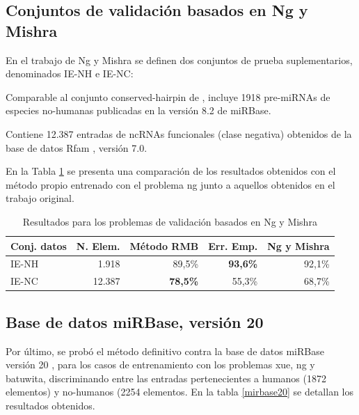\documentclass[12pt,bibliography=oldstyle,DIV=12,parskip=half-]{scrreprt}
\begin{document}
\subsection{Conjuntos de validación basados en Ng y Mishra}
%
En el trabajo de Ng y Mishra \cite{ng} se
definen dos conjuntos de prueba suplementarios, denominados IE-NH e IE-NC:
\begin{description}
  [style=sameline,leftmargin=9em,itemsep=6pt,align=right]
\item[IE-NH] Comparable al conjunto conserved-hairpin de \cite{xue}, incluye
  1918 pre-miRNAs de especies no-humanas publicadas en la versión 8.2 de
  miRBase.
\item[IE-NC] Contiene 12.387 entradas de ncRNAs funcionales (clase negativa)
  obtenidos de la base de datos Rfam \cite{rfam}, versión 7.0.
\end{description}
En la Tabla \ref{ng} se presenta una comparación de los resultados
obtenidos con el método propio entrenado con el problema ng junto
a aquellos obtenidos en el trabajo original.
\begin{table}[h]
  \small\center\sffamily
  \newcommand{\s}{\textbf}
  \begin{tabular}{lrrrr}\toprule
    Conj. datos & N. Elem. & Método RMB & Err. Emp. & Ng y Mishra \\\midrule
    IE-NH       &    1.918 & 89,5\%     & \s{93,6\%}    & 92,1\% \\
    IE-NC       &   12.387 & \s{78,5\%}     & 55,3\%    & 68,7\% \\\bottomrule
  \end{tabular}
  \caption{\small Resultados para los problemas de validación
    basados en Ng y Mishra \cite{ng}}
  \label{ng}
\end{table}
%
%
\subsection{Base de datos miRBase, versión 20}
%
Por último, se probó el método definitivo contra la base de datos
miRBase versión 20 \cite{mirbase3}, para los casos de entrenamiento
con los problemas xue, ng y batuwita, discriminando entre las entradas
pertenecientes a humanos (1872 elementos) y no-humanos (2254
elementos.  En la tabla \ref{mirbase20} se detallan los resultados
obtenidos.
\end{document}
